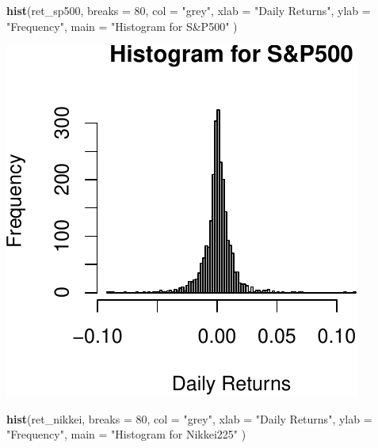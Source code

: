 \documentclass[11pt,]{article}
\newenvironment{Shaded}{\begin{snugshade}}{\end{snugshade}}
\newcommand{\KeywordTok}[1]{\textcolor[rgb]{0.13,0.29,0.53}{\textbf{#1}}}
\newcommand{\DataTypeTok}[1]{\textcolor[rgb]{0.13,0.29,0.53}{#1}}
\newcommand{\DecValTok}[1]{\textcolor[rgb]{0.00,0.00,0.81}{#1}}
\newcommand{\StringTok}[1]{\textcolor[rgb]{0.31,0.60,0.02}{#1}}
\newcommand{\NormalTok}[1]{#1}
\begin{document}
\begin{Shaded}
\begin{Highlighting}[]
\KeywordTok{hist}\NormalTok{(ret_sp500,}
     \DataTypeTok{breaks =} \DecValTok{80}\NormalTok{,}
     \DataTypeTok{col =} \StringTok{"grey"}\NormalTok{,}
     \DataTypeTok{xlab =} \StringTok{"Daily Returns"}\NormalTok{,}
     \DataTypeTok{ylab =} \StringTok{"Frequency"}\NormalTok{,}
     \DataTypeTok{main =} \StringTok{"Histogram for S&P500"}
\NormalTok{     )}
\end{Highlighting}
\end{Shaded}

\begin{center}\includegraphics{FMC_T4_PhD_Fin_Time_Series_files/figure-latex/histograms-2} \end{center}

\begin{Shaded}
\begin{Highlighting}[]
\KeywordTok{hist}\NormalTok{(ret_nikkei,}
     \DataTypeTok{breaks =} \DecValTok{80}\NormalTok{,}
     \DataTypeTok{col =} \StringTok{"grey"}\NormalTok{,}
     \DataTypeTok{xlab =} \StringTok{"Daily Returns"}\NormalTok{,}
     \DataTypeTok{ylab =} \StringTok{"Frequency"}\NormalTok{,}
     \DataTypeTok{main =} \StringTok{"Histogram for Nikkei225"}
\NormalTok{     )}
\end{Highlighting}
\end{Shaded}
\end{document}
